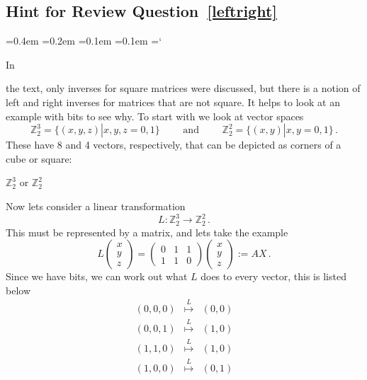 
\subsection*{Hint for Review Question~\ref{leftright}}

{\ttfamily
{}\font=0.4em
\font=0.2em
\font=0.1em
\font=0.1em
\hyphenchar\font=`\-


\hypertarget{inverse_matrix_hint}{In} 
the text, only inverses for square matrices were discussed, but there is a notion of left and right inverses for matrices that are not square.
It helps to look at an example with bits to see why.
To start with we look at vector spaces
\[{\mathbb Z}_2^3=\{(x,y,z)|x,y,z=0,1\}\qquad \mbox{ and } \qquad {\mathbb Z}_2^2=\{(x,y)|x,y=0,1\}\, .\]
These have 8 and 4 vectors, respectively, that can be depicted as corners of a cube or square:
\begin{center}
${\mathbb Z}_2^3$ \hspace{4mm} or ${\mathbb Z}_2^2$
\end{center}
Now lets consider a linear transformation
\[
L:{\mathbb Z}_2^3\longrightarrow{\mathbb Z}_2^2\, .
\]
This must be represented by a matrix, and lets take the example
\[
L\begin{pmatrix}x\\y\\z\end{pmatrix}=\begin{pmatrix}0 & 1 & 1\\1 & 1 &0\end{pmatrix}\begin{pmatrix}x\\y\\z\end{pmatrix}:=A X\, .
\]
Since we have bits, we can work out what $L$ does to every vector, this is listed below
\[
\begin{array}{ccc}
(0,0,0)&\stackrel{L}\mapsto&(0,0)\\[2mm]
(0,0,1)&\stackrel{L}\mapsto&(1,0)\\
(1,1,0)&\stackrel{L}\mapsto&(1,0)\\[2mm]
(1,0,0)&\stackrel{L}\mapsto&(0,1)\\

\end{array}\]}
